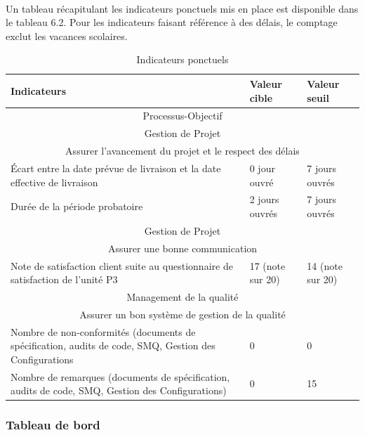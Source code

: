 \paragraph*{} Un tableau récapitulant les indicateurs ponctuels mis en place est disponible dans le tableau
6.2. Pour les indicateurs faisant référence à des délais, le comptage exclut les vacances scolaires.
\begin{table}[H]

\begin{tabular}[h]{|p{}|p{}|p{}|}
	\hline
	\rowcolor[gray]{0.85}
	Indicateurs & Valeur cible & Valeur seuil \\\hline
	\multicolumn{3}{|c|}{Processus-Objectif} \\\hline
	\multicolumn{3}{|c|}{\cellcolor[gray]{0.85} Gestion de Projet} \\
	\multicolumn{3}{|c|}{\cellcolor[gray]{0.85} Assurer l'avancement du projet et le respect des délais} \\\hline
	Écart entre la date prévue de livraison et la date effective de livraison & 0 jour ouvré & 7 jours ouvrés  \\\hline
	Durée de la période probatoire & 2 jours ouvrés & 7 jours ouvrés \\\hline
	\multicolumn{3}{|c|}{\cellcolor[gray]{0.85} Gestion de Projet} \\
	\multicolumn{3}{|c|}{\cellcolor[gray]{0.85} Assurer une bonne communication} \\\hline
	Note de satisfaction client suite au questionnaire de satisfaction de l'unité P3 & 17 (note sur 20) & 14 (note sur 20) \\\hline
	\multicolumn{3}{|c|}{\cellcolor[gray]{0.85} Management de la qualité} \\
	\multicolumn{3}{|c|}{\cellcolor[gray]{0.85} Assurer un bon système de gestion de la qualité} \\\hline
	Nombre de non-conformités (documents de spécification, audits de code, SMQ, Gestion des Configurations & 0 & 0 \\\hline
	Nombre de remarques (documents de spécification, audits de code, SMQ, Gestion des Configurations) & 0 & 15 \\\hline
	
\end{tabular}
\caption{Indicateurs ponctuels} \label{Tableau 6.2}
\end{table}

\subsubsection*{Tableau de bord}
\label{Tableau de bord}

